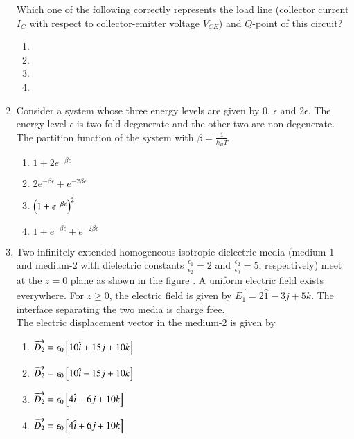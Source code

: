 \documentclass[journal,12pt,onecolumn]{IEEEtran}
\theoremstyle{remark}
\begin{document}
\begin{enumerate}[start=27]
	
	Which one of the following correctly represents the load line (collector current $I_C$ with respect to collector-emitter voltage $V_{CE}$) and $Q$-point of this circuit?
\begin{enumerate}
    \item
	    
    \item 
	    
    \item 
	    
    \item 
	    
   \end{enumerate}
\item Consider a system whose three energy levels are given by 0, $\epsilon$ and $2\epsilon$. The energy level $\epsilon$ is two-fold degenerate and the other two are non-degenerate. The partition function of the system with $\beta=\frac{1}{k_BT}$
\begin{enumerate}
    \item $1+2e^{-\beta \epsilon}$
    \item $2e^{-\beta \epsilon}+e^{-2\beta \epsilon}$
    \item $\left(1+e^{-\beta \epsilon}\right)^2$
    \item $1+e^{-\beta \epsilon}+e^{-2\beta \epsilon}$
\end{enumerate}
\item Two infinitely extended homogeneous isotropic dielectric media (medium-1 and medium-2 with dielectric constants $\frac{\epsilon_1}{\epsilon_2}=2$ and $\frac{\epsilon_2}{\epsilon_0}=5$, respectively) meet at the $z=0$ plane as shown in the figure . A uniform electric field exists everywhere. For $z \geq 0$, the electric field is given by $\overrightarrow{E_1}=2\hat{1}-3j+5k$. The interface separating the two media is charge free.\\ The electric displacement vector in the medium-2 is given by 
	
	\begin{enumerate}
    \item $\overrightarrow{D_2}=\epsilon_0{}\left[10\hat{i}+15j+10k\right]$
    \item $\overrightarrow{D_2}=\epsilon_0{}\left[10\hat{i}-15j+10k\right]$
    \item $\overrightarrow{D_2}=\epsilon_0{}\left[4\hat{i}-6j+10k\right]$
    \item $\overrightarrow{D_2}=\epsilon_0{}\left[4\hat{i}+6j+10k\right]$
\end{enumerate}

\end{enumerate}
\end{document}
